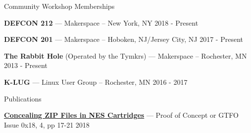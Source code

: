 \documentclass{resume} %
\begin{document}
\begin{rListSection}{Community Workshop Memberships}

\item \textbf{DEFCON 212} --- Makerspace -- New York, NY \hfill 2018 - Present

\item \textbf{DEFCON 201} --- Makerspace -- Hoboken, NJ/Jersey City, NJ  \hfill 2017 - Present

\item \textbf{The Rabbit Hole} (Operated by the Tymkrs) --- Makerspace -- Rochester, MN \hfill 2013 - Present

\item \textbf{K-LUG} --- Linux User Group -- Rochester, MN \hfill 2016 - 2017

\end{rListSection}


\begin{rListSection}{Publications}

\item \textbf{\href{https://www.alchemistowl.org/pocorgtfo/pocorgtfo18.pdf}{Concealing ZIP Files in NES Cartridges}} --- Proof of Concept or GTFO Issue 0x18, 4, pp 17-21  \hfill 2018

\end{rListSection}
\end{document}
